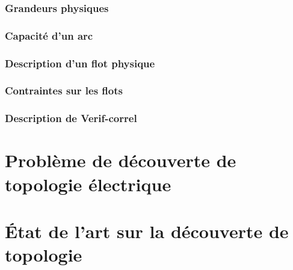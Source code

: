 			\subsubsection{Grandeurs physiques}
				
			\subsubsection{Capacit\'e d'un arc}
				
			\subsubsection{ Description d'un flot physique}
				
			\subsubsection{ Contraintes sur les flots}
				
			\subsubsection{Description de Verif-correl}
				
%			 	
		

	\section{Probl\`eme de d\'ecouverte de topologie \'electrique}
		
				
	\section{\'Etat de l'art sur la d\'ecouverte de topologie}
		
			
			
